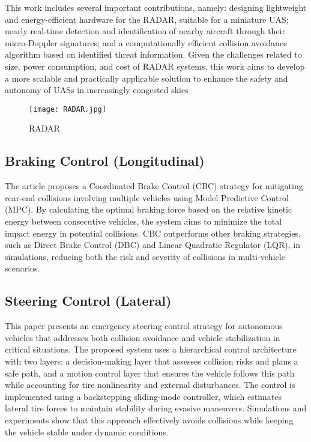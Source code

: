 \documentclass[12pt,twocolumn]{article}
\begin{document}
This work includes several important contributions, namely: designing lightweight and energy-efficient hardware for the RADAR, suitable for a miniature UAS; nearly real-time detection and identification of nearby aircraft through their micro-Doppler signatures; and a computationally efficient collision avoidance algorithm based on identified threat information. Given the challenges related to size, power consumption, and cost of RADAR systems, this work aims to develop a more scalable and practically applicable solution to enhance the safety and autonomy of UASs in increasingly congested skies

\begin{figure}[h]
\centering
\texttt{[image: RADAR.jpg]}
\caption{RADAR}
\label{fig_RADAR}
\end{figure}
\subsection{Braking Control (Longitudinal)}

The article proposes a Coordinated Brake Control (CBC) strategy for mitigating rear-end collisions involving multiple vehicles using Model Predictive Control (MPC). By calculating the optimal braking force based on the relative kinetic energy between consecutive vehicles, the system aims to minimize the total impact energy in potential collisions. CBC outperforms other braking strategies, such as Direct Brake Control (DBC) and Linear Quadratic Regulator (LQR), in simulations, reducing both the risk and severity of collisions in multi-vehicle scenarios.

\subsection{Steering Control (Lateral)}

This paper presents an emergency steering control strategy for autonomous vehicles that addresses both collision avoidance and vehicle stabilization in critical situations. The proposed system uses a hierarchical control architecture with two layers: a decision-making layer that assesses collision risks and plans a safe path, and a motion control layer that ensures the vehicle follows this path while accounting for tire nonlinearity and external disturbances. The control is implemented using a backstepping sliding-mode controller, which estimates lateral tire forces to maintain stability during evasive maneuvers. Simulations and experiments show that this approach effectively avoids collisions while keeping the vehicle stable under dynamic conditions.
\end{document}
